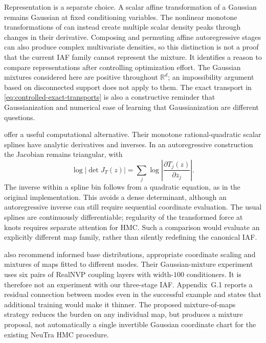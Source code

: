 Representation is a separate choice. A scalar affine transformation of a
Gaussian remains Gaussian at fixed conditioning variables. The nonlinear
monotone transformations of \citet[][Sec.~3 and Fig.~5]{huang2018naf}
can instead create multiple scalar density peaks through changes in their
derivative. Composing and permuting affine autoregressive stages can also
produce complex multivariate densities, so this distinction is not a proof
that the current IAF family cannot represent the mixture. It identifies a
reason to compare representations after controlling optimization effort.
The Gaussian mixtures considered here are positive throughout
$\mathbb R^d$; an impossibility argument based on disconnected support does
not apply to them. The exact transport in
\eqref{eq:controlled-exact-transports} is also a constructive reminder that
Gaussianization and numerical ease of learning that Gaussianization are
different questions.

\citet[][Sec.~3.1, Eqs.~(4)--(8)]{durkan2019splines} offer a useful
computational alternative. Their monotone rational-quadratic scalar splines
have analytic derivatives and inverses. In an autoregressive construction
the Jacobian remains triangular, with
\begin{equation}
 \log|\det J_T(z)|
 =\sum_j\log\left|\frac{\partial T_j(z)}{\partial z_j}\right|.
\end{equation}
The inverse within a spline bin follows from a quadratic equation, as in
the original implementation. This avoids a dense determinant, although an
autoregressive inverse can still require sequential coordinate evaluation.
The usual splines are continuously differentiable; regularity of the
transformed force at knots requires separate attention for HMC. Such a
comparison would evaluate an explicitly different map family, rather than
silently redefining the canonical IAF.

\citet[][Sec.~IV.E]{gabrie2022adaptiveflows} also recommend informed base
distributions, appropriate coordinate scaling and mixtures of maps fitted
to different modes. Their Gaussian-mixture experiment uses six pairs of
RealNVP coupling layers with width-$100$ conditioners. It is therefore not
an experiment with our three-stage IAF. Appendix~G.1 reports a residual
connection between modes even in the successful example and states that
additional training would make it thinner. The proposed mixture-of-maps
strategy reduces the burden on any individual map, but produces a mixture
proposal, not automatically a single invertible Gaussian coordinate chart
for the existing NeuTra HMC procedure.

